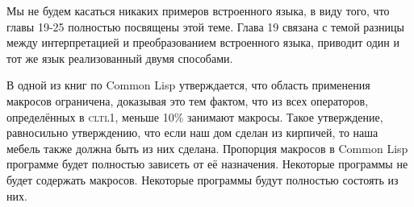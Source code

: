 \documentclass[12pt, a4paper]{article} %
\begin{document}
Мы не будем касаться никаких примеров встроенного языка, в виду того, что главы 19-25 полностью посвящены этой теме. Глава 19 связана с темой разницы между интерпретацией и преобразованием встроенного языка, приводит один и тот же язык реализованный двумя способами.

В одной из книг по Common Lisp утверждается, что область применения макросов ограничена, доказывая это тем фактом, что из всех операторов, определённых в \textsc{cltl1}, меньше 10\% занимают макросы. Такое утверждение, равносильно утверждению, что если наш дом сделан из кирпичей, то наша мебель также должна быть из них сделана.  Пропорция макросов в Common Lisp программе будет полностью зависеть от её назначения. Некоторые программы не будет содержать макросов. Некоторые программы будут полностью состоять из них.
\end{document}
